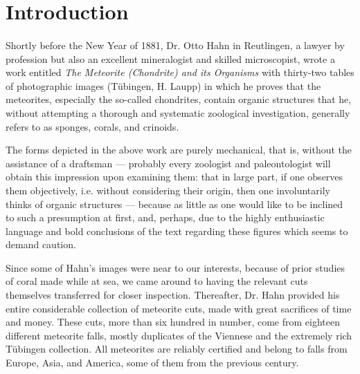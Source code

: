 \documentclass[a4paper, 12pt, oneside]{article}
\begin{document}
\section*{Introduction}
\paragraph{}
Shortly before the New Year of 1881, Dr. Otto Hahn in Reutlingen, a lawyer by profession but also an excellent mineralogist and skilled microscopist, wrote a work entitled \emph{The Meteorite (Chondrite) and its Organisms} with thirty-two tables of photographic images (Tübingen, H. Laupp) in which he proves that the meteorites, especially the so-called chondrites, contain organic structures that he, without attempting a thorough and systematic zoological investigation, generally refers to as sponges, corals, and crinoids.

The forms depicted in the above work are purely mechanical, that is, without the assistance of a draftsman --- probably every zoologist and paleontologist will obtain this impression upon examining them: that in large part, if one observes them objectively, i.e. without considering their origin, then one involuntarily thinks of organic structures --- because as little as one would like to be inclined to such a presumption at first, and, perhaps, due to the highly enthusiastic language and bold conclusions of the text regarding these figures which seems to demand caution.

Since some of Hahn's images were near to our interests, because of prior studies of coral made while at sea, we came around to having the relevant cuts themselves transferred for closer inspection. Thereafter, Dr. Hahn provided his entire considerable collection of meteorite cuts, made with great sacrifices of time and money. These cuts, more than six hundred in number, come from eighteen different meteorite falls, mostly duplicates of the Viennese and the extremely rich Tübingen collection. All meteorites are reliably certified and belong to falls from Europe, Asia, and America, some of them from the previous century.
\end{document}
